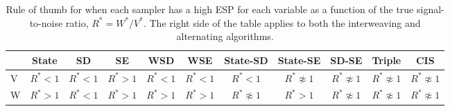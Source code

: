 \documentclass[12pt]{article}
\begin{document}


\setlength{\tabcolsep}{4pt}
\begin{table}
\small
  \centering
  \begin{tabular}{l|ccccc|ccccc}
     & State           & SD                 & SE                  & WSD                 & WSE & State-SD        & State-SE            & SD-SE              & Triple              & CIS \\\hline
   V & $R^* < 1$       & $R^* < 1$           & $R^* > 1$           & $R^* < 1$           & $R^* < 1$ & $R^* < 1$       & $R^* \not\approx 1$ & $R^* \not\approx 1$ & $R^* \not\approx 1$ & $R^* \not\approx 1$ \\ 
   W & $R^* > 1$       & $R^* < 1$           & $R^* > 1$           & $R^* > 1$           & $R^* > 1$ &$R^* \not\approx 1$& $R^* > 1$          & $R^* \not\approx 1$ & $R^* \not\approx 1$ & $R^* \not\approx 1$\\\hline
  \end{tabular}
  \caption{\small Rule of thumb for when each sampler has a high ESP for each variable as a function of the true signal-to-noise ratio, $R^*=W^*/V^*$. The right side of the table applies to both the interweaving and alternating algorithms.}
  \label{tab:stnmix}
\end{table}
\end{document}
